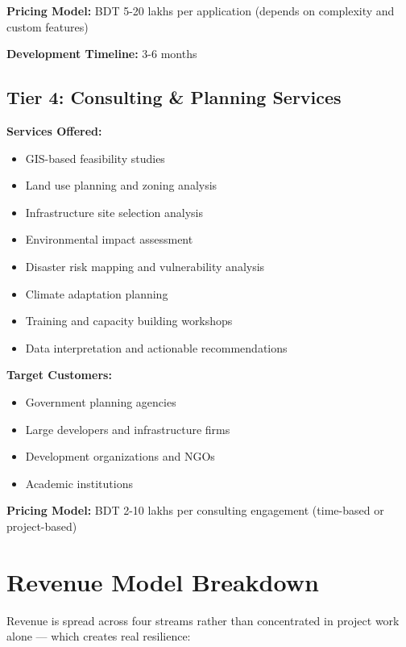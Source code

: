 \textbf{Pricing Model:} BDT 5-20 lakhs per application (depends on complexity and custom features)

\textbf{Development Timeline:} 3-6 months

\subsection{Tier 4: Consulting \& Planning Services}

\textbf{Services Offered:}
\begin{itemize}
    \item GIS-based feasibility studies
    \item Land use planning and zoning analysis
    \item Infrastructure site selection analysis
    \item Environmental impact assessment
    \item Disaster risk mapping and vulnerability analysis
    \item Climate adaptation planning
    \item Training and capacity building workshops
    \item Data interpretation and actionable recommendations
\end{itemize}

\textbf{Target Customers:}
\begin{itemize}
    \item Government planning agencies
    \item Large developers and infrastructure firms
    \item Development organizations and NGOs
    \item Academic institutions
\end{itemize}

\textbf{Pricing Model:} BDT 2-10 lakhs per consulting engagement (time-based or project-based)

\section{Revenue Model Breakdown}

Revenue is spread across four streams rather than concentrated in project work alone --- which creates real resilience:

